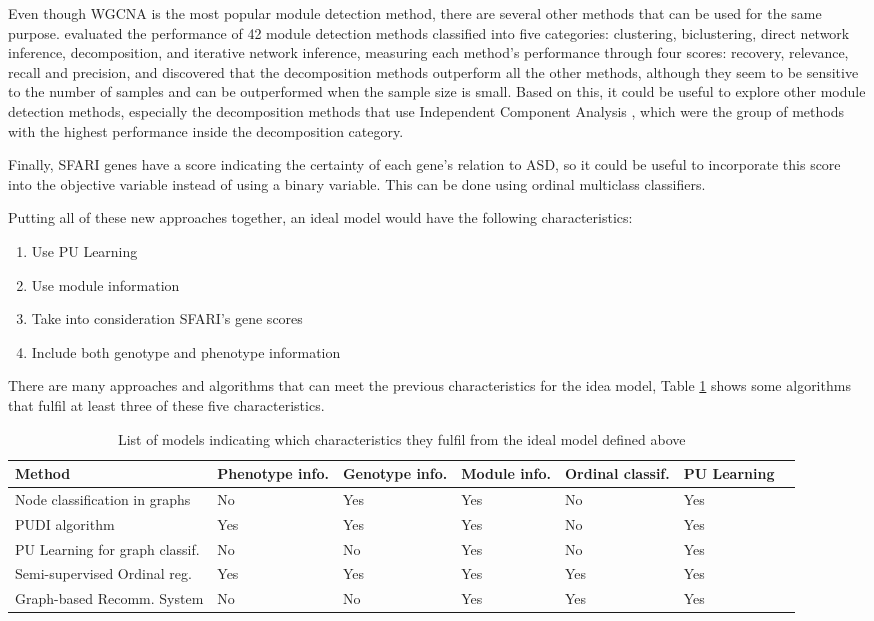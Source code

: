 Even though WGCNA is the most popular module detection method, there are several other methods that can be used for the same purpose. \cite{saelens_comprehensive_2018} evaluated the performance of 42 module detection methods classified into five categories: clustering, biclustering, direct network inference, decomposition, and iterative network inference, measuring each method's performance through four scores: recovery, relevance, recall and precision, and discovered that the decomposition methods outperform all the other methods, although they seem to be sensitive to the number of samples and can be outperformed when the sample size is small. Based on this, it could be useful to explore other module detection methods, especially the decomposition methods that use Independent Component Analysis \cite{lee_application_2003}, which were the group of methods with the highest performance inside the decomposition category.

Finally, SFARI genes have a score indicating the certainty of each gene's relation to ASD, so it could be useful to incorporate this score into the objective variable instead of using a binary variable. This can be done using ordinal multiclass classifiers.

Putting all of these new approaches together, an ideal model would have the following characteristics:
\begin{enumerate}
    \item Use PU Learning
    \item Use module information
    \item Take into consideration SFARI's gene scores
    \item Include both genotype and phenotype information
\end{enumerate}

There are many approaches and algorithms that can meet the previous characteristics for the idea model, Table \ref{table:PossibleClassificationMethods} shows some algorithms that fulfil at least three of these five characteristics.

\begin{table}[ht]
\begin{tabularx}{\linewidth}{l X X X X X X}
Method & Phenotype info. & Genotype info. & Module info. & Ordinal classif. & PU Learning \\
\hline
Node classification in graphs   & No  & Yes & Yes & No  & Yes \\
PUDI algorithm                  & Yes & Yes & Yes & No  & Yes \\
PU Learning for graph classif.  & No  & No  & Yes & No  & Yes \\
Semi-supervised Ordinal reg.    & Yes & Yes & Yes & Yes & Yes \\
Graph-based Recomm. System      & No  & No  & Yes & Yes & Yes \\
\end{tabularx}
\caption{List of models indicating which characteristics they fulfil from the ideal model defined above}
\label{table:PossibleClassificationMethods}
\end{table}


